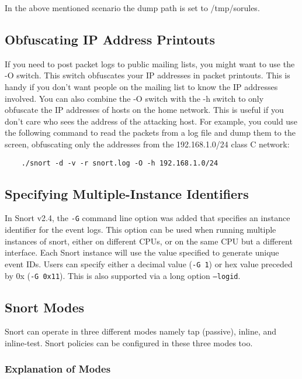 \documentclass[english]{report}
\begin{document}
In the above mentioned scenario the dump path is set to /tmp/sorules.

\subsection{Obfuscating IP Address Printouts}

If you need to post packet logs to public mailing lists, you might want to use
the -O switch. This switch obfuscates your IP addresses in packet printouts.
This is handy if you don't want people on the mailing list to know the IP
addresses involved. You can also combine the -O switch with the -h switch to
only obfuscate the IP addresses of hosts on the home network.  This is useful
if you don't care who sees the address of the attacking host.  For example, you
could use the following command to read the packets from a log file and dump
them to the screen, obfuscating only the addresses from the 192.168.1.0/24
class C network:
 
\begin{verbatim}
    ./snort -d -v -r snort.log -O -h 192.168.1.0/24
\end{verbatim}

\subsection{Specifying Multiple-Instance Identifiers}

In Snort v2.4, the \texttt{-G} command line option was added that specifies an
instance identifier for the event logs.  This option can be used when running
multiple instances of snort, either on different CPUs, or on the same CPU but a
different interface.  Each Snort instance will use the value specified to
generate unique event IDs.  Users can specify either a decimal value
(\texttt{-G 1}) or hex value preceded by 0x (\texttt{-G 0x11}).  This is also
supported via a long option \texttt{--logid}.

\subsection{Snort Modes}

Snort can operate in three different modes namely tap (passive), inline, and inline-test.
Snort policies can be configured in these three modes too. 

\subsubsection{Explanation of Modes}
\end{document}
